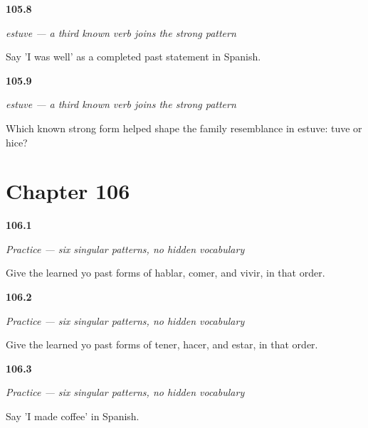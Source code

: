 \noindent\begin{minipage}[t]{\linewidth}
\raggedright
\hypertarget{review-ES-C15-preterite-fuertes-estuve-bien}{\textbf{105.8}} \emph{estuve — a third known verb joins the strong pattern}\par
\small Say 'I was well' as a completed past statement in Spanish.
\end{minipage}\par\medskip

\noindent\begin{minipage}[t]{\linewidth}
\raggedright
\hypertarget{review-ES-C15-preterite-fuertes-analogy}{\textbf{105.9}} \emph{estuve — a third known verb joins the strong pattern}\par
\small Which known strong form helped shape the family resemblance in estuve: tuve or hice?
\end{minipage}\par\medskip

\section*{Chapter 106}

\noindent\begin{minipage}[t]{\linewidth}
\raggedright
\hypertarget{review-ES-C15-practice-regular-yo-forms}{\textbf{106.1}} \emph{Practice — six singular patterns, no hidden vocabulary}\par
\small Give the learned yo past forms of hablar, comer, and vivir, in that order.
\end{minipage}\par\medskip

\noindent\begin{minipage}[t]{\linewidth}
\raggedright
\hypertarget{review-ES-C15-practice-strong-yo-forms}{\textbf{106.2}} \emph{Practice — six singular patterns, no hidden vocabulary}\par
\small Give the learned yo past forms of tener, hacer, and estar, in that order.
\end{minipage}\par\medskip

\noindent\begin{minipage}[t]{\linewidth}
\raggedright
\hypertarget{review-ES-C15-practice-hice-cafe}{\textbf{106.3}} \emph{Practice — six singular patterns, no hidden vocabulary}\par
\small Say 'I made coffee' in Spanish.
\end{minipage}\par\medskip

